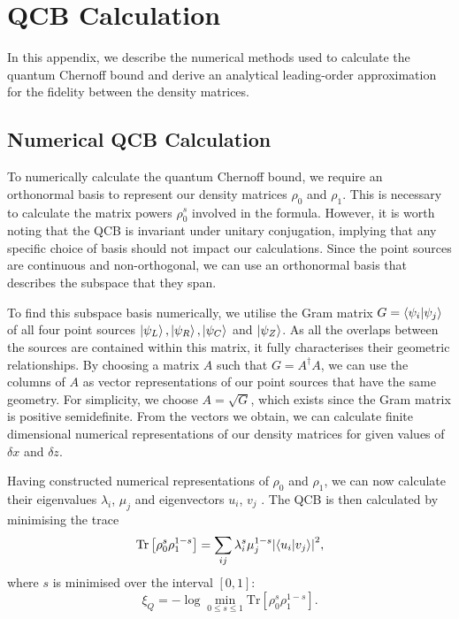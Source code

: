 \documentclass[reprint,amsmath,amssymb,aps,prl,floatfix,groupedaddress,superscriptaddress]{revtex4-2}
\begin{document}
\section{QCB Calculation} \label{app:QCB_calculation}

In this appendix, we describe the numerical methods used to calculate the quantum Chernoff bound and derive an analytical leading-order approximation for the fidelity between the density matrices.

\subsection{Numerical QCB Calculation} \label{app:QCB_calculation_numerical}

To numerically calculate the quantum Chernoff bound, we require an orthonormal basis to represent our density matrices $\rho_0$ and $\rho_1$. This is necessary to calculate the matrix powers $\rho_0^s$ involved in the formula. However, it is worth noting that the QCB is invariant under unitary conjugation, implying that any specific choice of basis should not impact our calculations. Since the point sources are continuous and non-orthogonal, we can use an orthonormal basis that describes the subspace that they span.

To find this subspace basis numerically, we utilise the Gram matrix $G = \braket{\psi_i}{\psi_j}$ of all four point sources $\ket{\psi_L}, \ket{\psi_R}, \ket{\psi_C}$ and $\ket{\psi_Z}$. As all the overlaps between the sources are contained within this matrix, it fully characterises their geometric relationships. By choosing a matrix $A$ such that $G=A^\dagger A$, we can use the columns of $A$ as vector representations of our point sources that have the same geometry. For simplicity, we choose $A = \sqrt{G}$, which exists since the Gram matrix is positive semidefinite. From the vectors we obtain, we can calculate finite dimensional numerical representations of our density matrices for given values of $\delta x$ and $\delta z$.

Having constructed numerical representations of $\rho_0$ and $\rho_1$, we can now calculate their eigenvalues $\lambda_i$, $\mu_j$ and eigenvectors $u_i$, $v_j$ \cite{audenaert2007discriminating}. The QCB is then calculated by minimising the trace
\begin{equation}
    \text{Tr}\left[\rho_0^s \rho_1^{1-s} \right] = \sum_{ij} \lambda_i^s \mu_j^{1-s} \abs{\braket{u_i}{v_j}}^2,
\end{equation}
where $s$ is minimised over the interval $[0,1]$:
\begin{equation}
\xi_Q = -\log \min_{0 \leq s \leq 1} \text{Tr} \left[ \rho_0^s \rho_1^{1-s} \right].
\end{equation}
\end{document}
